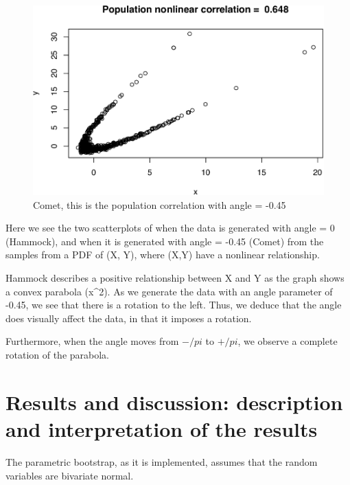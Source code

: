 \documentclass[11pt,]{article}
\begin{document}
\begin{figure}

{\centering \includegraphics{RapportSTAT_files/figure-latex/nonlinear_q2-1} 

}

\caption{Comet, this is the population correlation with angle = -0.45}\label{fig:nonlinear_q2}
\end{figure}

Here we see the two scatterplots of when the data is generated with
angle = 0 (Hammock), and when it is generated with angle = -0.45 (Comet)
from the samples from a PDF of (X, Y), where (X,Y) have a nonlinear
relationship.

Hammock describes a positive relationship between X and Y as the graph
shows a convex parabola (x\^{}2). As we generate the data with an angle
parameter of -0.45, we see that there is a rotation to the left. Thus,
we deduce that the angle does visually affect the data, in that it
imposes a rotation.

Furthermore, when the angle moves from \(-/pi\) to \(+/pi\), we observe
a complete rotation of the parabola.

\hypertarget{results-and-discussion-description-and-interpretation-of-the-results}{%
\section{Results and discussion: description and interpretation of the
results}\label{results-and-discussion-description-and-interpretation-of-the-results}}

The parametric bootstrap, as it is implemented, assumes that the random
variables are bivariate normal.
\end{document}
